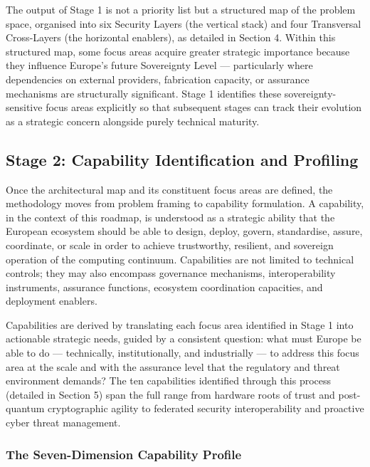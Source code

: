 \documentclass{ieeeaccess}
\begin{document}
The output of Stage 1 is not a priority list but a structured map of the
problem space, organised into six Security Layers (the vertical stack)
and four Transversal Cross-Layers (the horizontal enablers), as detailed
in Section 4. Within this structured map, some focus areas acquire
greater strategic importance because they influence Europe's future
Sovereignty Level --- particularly where dependencies on external
providers, fabrication capacity, or assurance mechanisms are
structurally significant. Stage 1 identifies these sovereignty-sensitive
focus areas explicitly so that subsequent stages can track their
evolution as a strategic concern alongside purely technical maturity.

\subsection{Stage 2: Capability Identification and
Profiling}\label{stage-2-capability-identification-and-profiling}

Once the architectural map and its constituent focus areas are defined,
the methodology moves from problem framing to capability formulation. A
capability, in the context of this roadmap, is understood as a strategic
ability that the European ecosystem should be able to design, deploy,
govern, standardise, assure, coordinate, or scale in order to achieve
trustworthy, resilient, and sovereign operation of the computing
continuum. Capabilities are not limited to technical controls; they may
also encompass governance mechanisms, interoperability instruments,
assurance functions, ecosystem coordination capacities, and deployment
enablers.

Capabilities are derived by translating each focus area identified in
Stage 1 into actionable strategic needs, guided by a consistent
question: what must Europe be able to do --- technically,
institutionally, and industrially --- to address this focus area at the
scale and with the assurance level that the regulatory and threat
environment demands? The ten capabilities identified through this
process (detailed in Section 5) span the full range from hardware roots
of trust and post-quantum cryptographic agility to federated security
interoperability and proactive cyber threat management.

\subsubsection{The Seven-Dimension Capability
Profile}\label{the-seven-dimension-capability-profile}
\end{document}

